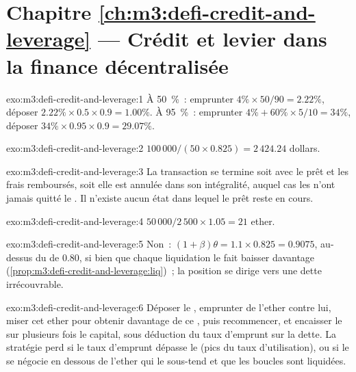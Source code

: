 \section*{Chapitre \ref{ch:m3:defi-credit-and-leverage} --- Crédit et levier dans la finance décentralisée}

\begin{solution}{exo:m3:defi-credit-and-leverage:1}
À 50~\%~: emprunter $4\% \times 50/90 = 2.22\%$, déposer $2.22\% \times 0.5 \times 0.9 = 1.00\%$. À 95~\%~: emprunter $4\% + 60\% \times 5/10 = 34\%$,
déposer $34\% \times 0.95 \times 0.9 = 29.07\%$.
\end{solution}

\begin{solution}{exo:m3:defi-credit-and-leverage:2}
$100\,000/(50 \times 0.825) = 2\,424.24$ dollars.
\end{solution}

\begin{solution}{exo:m3:defi-credit-and-leverage:3}
La transaction se termine soit avec le prêt et les frais remboursés, soit elle est annulée dans son intégralité, auquel cas les  n'ont jamais quitté le . Il n'existe aucun état dans
lequel le prêt reste en cours.
\end{solution}

\begin{solution}{exo:m3:defi-credit-and-leverage:4}
$50\,000/2\,500 \times 1.05 = 21$ ether.
\end{solution}

\begin{solution}{exo:m3:defi-credit-and-leverage:5}
Non~: $(1 + \beta)\theta = 1.1 \times 0.825 = 0.9075$, au-dessus du  de 0.80, si bien que chaque liquidation le fait baisser davantage
(\cref{prop:m3:defi-credit-and-leverage:liq})~; la position se dirige vers une dette irrécouvrable.
\end{solution}

\begin{solution}{exo:m3:defi-credit-and-leverage:6}
Déposer le , emprunter de l'ether contre lui, miser cet ether pour obtenir davantage de ce , puis recommencer, et encaisser le  sur plusieurs
fois le capital, sous déduction du taux d'emprunt sur la dette. La stratégie perd si le taux d'emprunt dépasse le  (pics du taux d'utilisation), ou si le 
se négocie en dessous de l'ether qui le sous-tend et que les boucles sont liquidées.
\end{solution}

